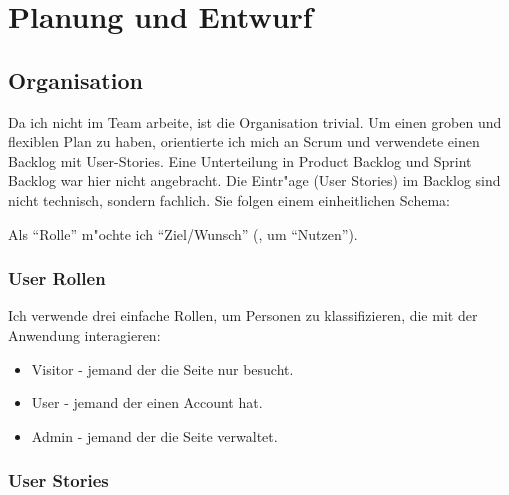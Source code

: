 

\chapter{Planung und Entwurf}\label{ch:planung-und-entwurf}


\section{Organisation}\label{sec:organisation}
Da ich nicht im Team arbeite, ist die Organisation trivial.
Um einen groben und flexiblen Plan zu haben, orientierte ich mich an Scrum und verwendete einen Backlog mit User-Stories.
Eine Unterteilung in Product Backlog und Sprint Backlog war hier nicht angebracht.
Die Eintr{"a}ge (User Stories) im Backlog sind nicht technisch, sondern fachlich.
Sie folgen einem einheitlichen Schema:
\begin{center}
    Als ``Rolle'' m{"o}chte ich ``Ziel/Wunsch'' (, um ``Nutzen'').
\end{center}

\subsection{User Rollen}\label{subsec:user-rollen}
Ich verwende drei einfache Rollen, um Personen zu klassifizieren, die mit der Anwendung interagieren:
\begin{itemize}
    \item Visitor - jemand der die Seite nur besucht.
    \item User - jemand der einen Account hat.
    \item Admin - jemand der die Seite verwaltet.
\end{itemize}

\subsection{User Stories}\label{subsec:user-stories}

